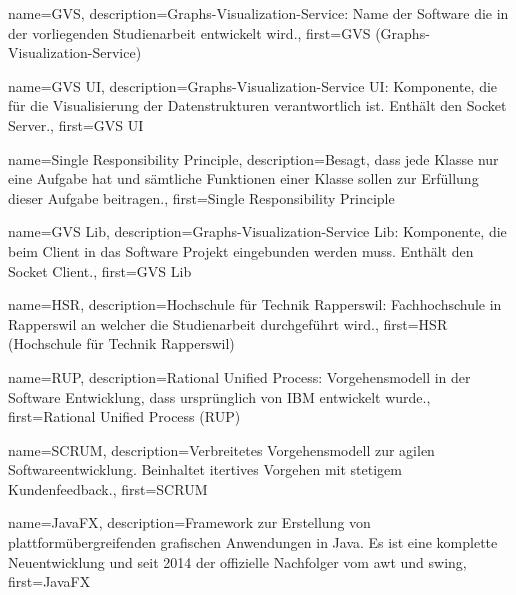 



{
	name={GVS},
	description={Graphs-Visualization-Service: Name der Software die in der vorliegenden Studienarbeit entwickelt wird.},
	first={GVS (Graphs-Visualization-Service)}
}

{
	name={GVS UI},
	description={Graphs-Visualization-Service UI: Komponente, die für die Visualisierung der Datenstrukturen verantwortlich ist. Enthält den Socket Server.},
	first={GVS UI}
}

{
	name={Single Responsibility Principle},
	description={Besagt, dass jede Klasse nur eine Aufgabe hat und sämtliche Funktionen einer Klasse sollen zur Erfüllung dieser Aufgabe beitragen.},
	first={Single Responsibility Principle}
}

{
	name={GVS Lib},
	description={Graphs-Visualization-Service Lib: Komponente, die beim Client in das Software Projekt eingebunden werden muss. Enthält den Socket Client.},
	first={GVS Lib}
}


{
	name={HSR},
	description={Hochschule für Technik Rapperswil: Fachhochschule in Rapperswil an welcher die Studienarbeit durchgeführt wird.},
	first={HSR (Hochschule für Technik Rapperswil)}
}

{
	name={RUP},
	description={Rational Unified Process: Vorgehensmodell in der Software Entwicklung, dass ursprünglich von IBM entwickelt wurde.},
	first={Rational Unified Process (RUP)}
}

{
	name={SCRUM},
	description={Verbreitetes Vorgehensmodell zur agilen Softwareentwicklung. Beinhaltet itertives Vorgehen mit stetigem Kundenfeedback.},
	first={SCRUM}
}

{
	name={JavaFX},
	description={Framework zur Erstellung von plattformübergreifenden grafischen Anwendungen in Java. Es ist eine komplette Neuentwicklung und seit 2014 der offizielle Nachfolger vom \gls{awt} und \gls{swing}},
	first={JavaFX}
}


